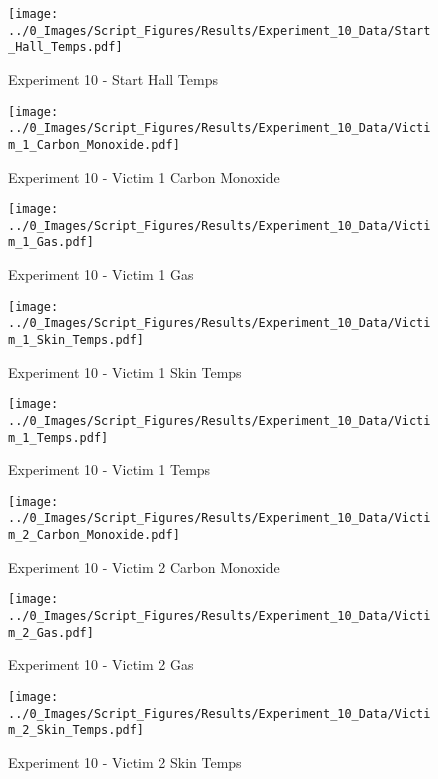 	\begin{figure}[H]
		\centering
		\texttt{[image: ../0\_Images/Script\_Figures/Results/Experiment\_10\_Data/Start\_Hall\_Temps.pdf]}
		\caption[]{Experiment 10 - Start Hall Temps}
	\end{figure}
 
	\clearpage

	\begin{figure}[H]
		\centering
		\texttt{[image: ../0\_Images/Script\_Figures/Results/Experiment\_10\_Data/Victim\_1\_Carbon\_Monoxide.pdf]}
		\caption[]{Experiment 10 - Victim 1 Carbon Monoxide}
	\end{figure}
 

	\begin{figure}[H]
		\centering
		\texttt{[image: ../0\_Images/Script\_Figures/Results/Experiment\_10\_Data/Victim\_1\_Gas.pdf]}
		\caption[]{Experiment 10 - Victim 1 Gas}
	\end{figure}
 
	\clearpage

	\begin{figure}[H]
		\centering
		\texttt{[image: ../0\_Images/Script\_Figures/Results/Experiment\_10\_Data/Victim\_1\_Skin\_Temps.pdf]}
		\caption[]{Experiment 10 - Victim 1 Skin Temps}
	\end{figure}
 

	\begin{figure}[H]
		\centering
		\texttt{[image: ../0\_Images/Script\_Figures/Results/Experiment\_10\_Data/Victim\_1\_Temps.pdf]}
		\caption[]{Experiment 10 - Victim 1 Temps}
	\end{figure}
 
	\clearpage

	\begin{figure}[H]
		\centering
		\texttt{[image: ../0\_Images/Script\_Figures/Results/Experiment\_10\_Data/Victim\_2\_Carbon\_Monoxide.pdf]}
		\caption[]{Experiment 10 - Victim 2 Carbon Monoxide}
	\end{figure}
 

	\begin{figure}[H]
		\centering
		\texttt{[image: ../0\_Images/Script\_Figures/Results/Experiment\_10\_Data/Victim\_2\_Gas.pdf]}
		\caption[]{Experiment 10 - Victim 2 Gas}
	\end{figure}
 
	\clearpage

	\begin{figure}[H]
		\centering
		\texttt{[image: ../0\_Images/Script\_Figures/Results/Experiment\_10\_Data/Victim\_2\_Skin\_Temps.pdf]}
		\caption[]{Experiment 10 - Victim 2 Skin Temps}
	\end{figure}
 

